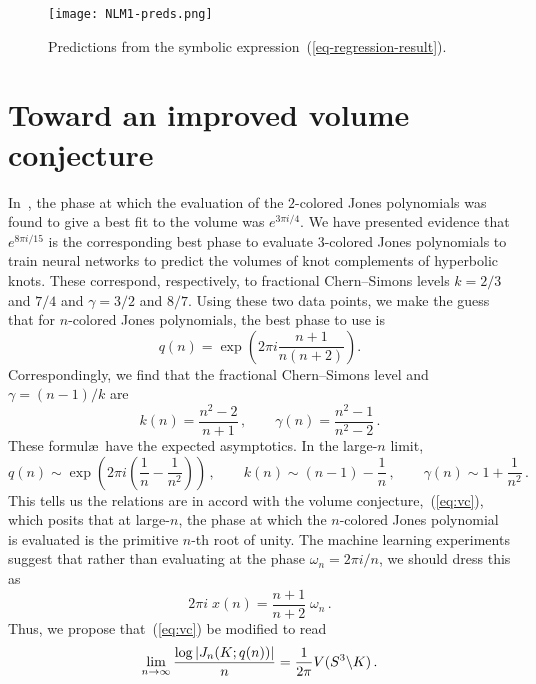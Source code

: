\documentclass[11pt]{article}
\newcommand{\eref}[1]{(\ref{#1})}
\begin{document}
\begin{figure}[t]
    \begin{center}
        \texttt{[image: NLM1-preds.png]}
    \end{center}
    \caption{\textsf{Predictions from the symbolic expression~(\ref{eq-regression-result}).}}  \label{fig:nlm-fit}
\end{figure}

\section{Toward an improved volume conjecture}\label{sec:newvc}

In~\cite{Craven:2020bdz}, the phase at which the evaluation of the $2$-colored Jones polynomials was found to give a best fit to the volume was $e^{3\pi i/4}$.
We have presented evidence that $e^{8\pi i/15}$ is the corresponding best phase to evaluate $3$-colored Jones polynomials to train neural networks to predict the volumes of knot complements of hyperbolic knots.
These correspond, respectively, to fractional Chern--Simons levels $k = 2/3$ and $7/4$ and $\gamma = 3/2$ and $8/7$.
Using these two data points, we make the guess that for $n$-colored Jones polynomials, the best phase to use is
\begin{equation}        \label{eq:best-phase-guess-2}
    q(n) = \exp\left( 2\pi i \frac{n+1}{n(n+2)} \right).
\end{equation}
Correspondingly, we find that the fractional Chern--Simons level and $\gamma=(n-1)/k$ are
\begin{equation}
    k(n) = \frac{n^2-2}{n+1} \,, \qquad
    \gamma(n) = \frac{n^2-1}{n^2-2} \,.
\end{equation}
These formul\ae\ have the expected asymptotics.
In the large-$n$ limit,
\begin{equation}
q(n) \sim \exp \left( 2\pi i \left( \frac{1}{n}-\frac{1}{n^2} \right) \right) \,, \qquad
k(n) \sim (n-1)-\frac{1}{n} \,, \qquad
\gamma(n) \sim 1+\frac{1}{n^2} \,.
\end{equation}
This tells us the relations are in accord with the volume conjecture,~\eref{eq:vc}, which posits that at large-$n$, the phase at which the $n$-colored Jones polynomial is evaluated is the primitive $n$-th root of unity.
The machine learning experiments suggest that rather than evaluating at the phase $\omega_n = 2\pi i/n$, we should dress this as
\begin{equation}
2\pi i\; x(n) = \frac{n+1}{n+2}\; \omega_n \,.
\end{equation}
Thus, we propose that~\eref{eq:vc} be modified to read
\begin{equation}\label{eq:vc-new}
	\lim_{n\to\infty} \frac{\log|J_n(K; q(n))|}n = \frac1{2\pi} V(S^3\backslash K) \,.
\end{equation}
\end{document}
